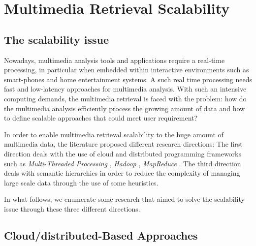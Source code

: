 	\section{Multimedia Retrieval Scalability}

		\subsection{The scalability issue}

		Nowadays, multimedia analysis tools and applications require a real-time processing, in particular 
		when embedded within interactive environments such as smart-phones and home entertainment systems. 
		A such real time processing needs fast and low-latency approaches for multimedia analysis. 
		With such an intensive computing demands, the multimedia retrieval is faced with the problem: 
		how do the multimedia analysis efficiently process the growing amount of data and how to define 
		scalable approaches that could meet user requirement?

		In order to enable multimedia retrieval scalability to the huge amount of multimedia data, 
		the literature proposed  different research directions: The first direction deals 
		with the use of cloud and distributed programming frameworks such as \emph{Multi-Threaded Processing} 
		\citep{Amit2006},  \emph{Hadoop} \citep{White2012,Landset2015}, \emph{MapReduce} 
		\citep{Dean2008,Dean2010} .
		The third direction deals with semantic hierarchies 
		\citep{Deng2010,Zhou2014,Ordonez2015} in order to reduce the complexity of managing 
		large scale data through the use of some heuristics.
		
		In what follows, we enumerate some
		research  that aimed to solve the scalability issue through 
		these three different directions.

		\subsection{Cloud/distributed-Based Approaches}
		
		
